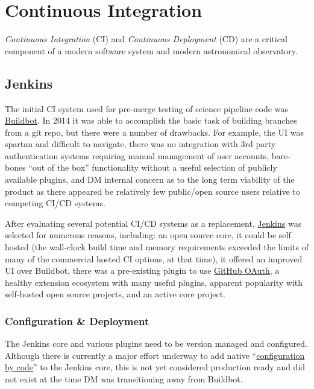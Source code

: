 \section{Continuous Integration}

\emph{Continuous Integration} (CI) and \emph{Continuous Deployment} (CD) are a critical component of a modern software system and modern astronomical observatory.\cite{2014arXiv1407.6463E}

\subsection{Jenkins}
\label{sec:jenkins}

The initial CI system used for pre-merge testing of
science pipeline code was \href{https://buildbot.net/}{Buildbot}.
In 2014 it was able to accomplish the basic task of building branches from a git repo,
but there were a number of drawbacks.
For example, the UI was spartan and difficult to navigate, there was no
integration with 3rd party authentication systems requiring manual management
of user accounts, bare-bones ``out of the box'' functionality without a useful
selection of publicly available plugins, and DM internal concern as to the long
term viability of the product as there appeared be relatively few public/open source users
relative to competing CI/CD systems.

After evaluating several potential CI/CD systems as a replacement,
\href{https://jenkins.io/}{Jenkins} was selected for numerous reasons, including:
an open source core, it could be self hosted (the wall-clock build
time and memory requirements exceeded the limits of many of the commercial
hosted CI options, at that time), it offered an improved UI over Buildbot,
there was a pre-existing plugin to use \href{https://plugins.jenkins.io/github-oauth}{GitHub OAuth},
a healthy extension ecosystem with many useful plugins, apparent popularity with self-hosted
open source projects, and an active core project.

\subsubsection{Configuration \& Deployment}

The Jenkins core and various plugins need to be version managed and configured.
Although there is currently a major effort underway to add native
``\href{https://github.com/jenkinsci/configuration-as-code-plugin}{configuration by code}'' to
the Jenkins core, this is not yet considered production ready and did not exist
at the time DM was transitioning away from Buildbot.

